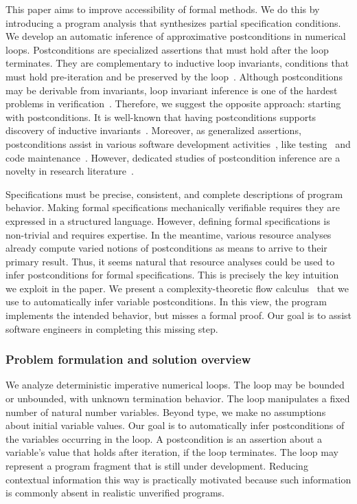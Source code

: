 This paper aims to improve accessibility of formal methods.
We do this by introducing a program analysis that synthesizes partial specification conditions.
We develop an automatic inference of approximative postconditions in numerical loops.
Postconditions are specialized assertions that must hold after the loop terminates.
They are complementary to {inductive loop invariants}, \ie conditions that must hold pre-iteration and be preserved by the loop~\cite{sankaranarayanan2004}.
Although postconditions may be derivable from invariants, loop invariant inference is one of the hardest problems in verification~\cite{dillig2013,si2018}.
Therefore, we suggest the opposite approach: starting with postconditions.
It is well-known that having postconditions supports discovery of inductive invariants~\cite{furia2010}.
Moreover, as generalized assertions, postconditions assist in various software development activities~\cite{nguyen2022}, like testing~\cite{alagarsamy2024,zhang2015} and code maintenance~\cite{rosenblum1995}.
However, dedicated studies of postcondition inference are a novelty in research literature~\cite{popeea2006,molina2021}.

Specifications must be precise, consistent, and complete descriptions of program behavior.
Making formal specifications mechanically verifiable requires they are expressed in a structured language.
However, defining formal specifications is non-trivial and requires expertise.
In the meantime, various resource analyses~\cite{jones2009,brockschmidt2016} already compute varied notions of postconditions as means to arrive to their primary result.
Thus, it seems natural that {resource analyses could be used to infer postconditions} for formal specifications.
This is precisely the key intuition we exploit in the paper.
We present a complexity\hyp{}theoretic flow calculus~\cite{jones2009,aubert20222} that we use to automatically infer variable postconditions.
In this view, the program implements the intended behavior, but misses a formal proof.
Our goal is to assist software engineers in completing this missing step.

\subsubsection{Problem formulation and solution overview}
\label{subsec:overview}

We analyze deterministic imperative numerical loops.
The loop may be bounded or unbounded, with unknown termination behavior.
The loop manipulates a fixed number of natural number variables.
Beyond type, we make no assumptions about initial variable values.
Our goal is to automatically infer postconditions of the variables occurring in the loop.
A postcondition is an assertion about a variable's value that holds after iteration, if the loop terminates.
The loop may represent a program {fragment} that is still under development. %
Reducing contextual information this way is practically motivated because such information is commonly absent in realistic unverified programs.

